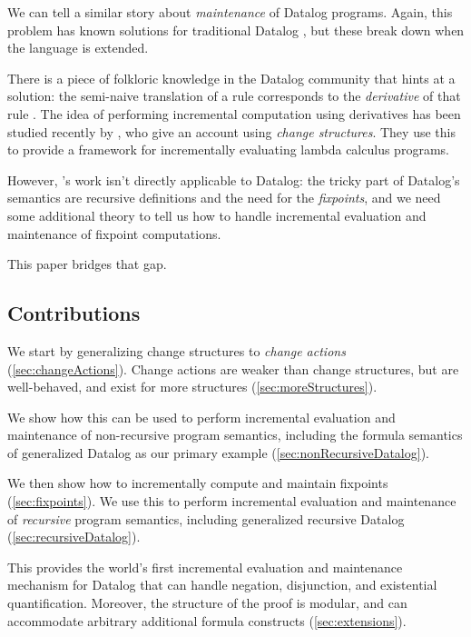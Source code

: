 We can tell a similar story about \emph{maintenance} of Datalog programs. Again,
this problem has known solutions for traditional Datalog
\autocite{gupta1993maintaining}, but these break down when the language is extended.

There is a piece of folkloric knowledge in the Datalog community that hints at a
solution: the semi-naive translation of a rule corresponds to the
\emph{derivative} of that rule \autocites{bancilhon1986naive}[section
3.2.2]{bancilhon1986amateur}. The idea of performing incremental computation using derivatives has been
studied recently by \textcite{cai2014changes}, who give an account using
\emph{change structures}. They use this to provide a framework for incrementally evaluating lambda calculus programs.

However, \citeauthor{cai2014changes}'s work isn't directly applicable to Datalog: the tricky part
of Datalog's semantics are recursive definitions and the need for the \emph{fixpoints}, and we need some additional theory to tell us how to
handle incremental evaluation and maintenance of fixpoint computations.

This paper bridges that gap.
 
\subsection{Contributions}

We start by generalizing change structures to
\emph{change actions} (\cref{sec:changeActions}). Change actions are weaker than change structures, but
are well-behaved, and exist for more structures (\cref{sec:moreStructures}).

We show how this can be used to perform incremental evaluation and maintenance
of non-recursive program semantics, including the formula semantics of generalized Datalog as our primary
example (\cref{sec:nonRecursiveDatalog}).

We then show how to incrementally compute and maintain fixpoints
(\cref{sec:fixpoints}). We use this to perform incremental evaluation and
maintenance of \emph{recursive} program semantics, including generalized
recursive Datalog (\cref{sec:recursiveDatalog}).

This provides the world's first incremental
evaluation and maintenance mechanism for Datalog that can handle negation,
disjunction, and existential quantification. Moreover, the structure of the
proof is modular, and can accommodate arbitrary additional
formula constructs (\cref{sec:extensions}).

